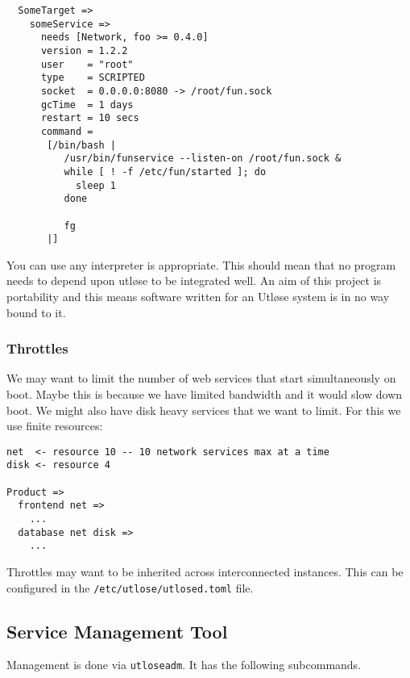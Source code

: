 \documentclass{article}
\begin{document}
\begin{verbatim}
  SomeTarget =>
    someService =>
      needs [Network, foo >= 0.4.0]
      version = 1.2.2
      user    = "root"
      type    = SCRIPTED
      socket  = 0.0.0.0:8080 -> /root/fun.sock
      gcTime  = 1 days
      restart = 10 secs
      command = 
       [/bin/bash |
          /usr/bin/funservice --listen-on /root/fun.sock &
          while [ ! -f /etc/fun/started ]; do
            sleep 1
          done

          fg
       |]
\end{verbatim}

You can use any interpreter is appropriate. This should mean that no program needs to depend
upon utløse to be integrated well. An aim of this project is portability and this means
software written for an Utløse system is in no way bound to it.

\subsubsection{Throttles}
We may want to limit the number of web services that start simultaneously on boot.
Maybe this is because we have limited bandwidth and it would slow down boot.
We might also have disk heavy services that we want to limit.
For this we use finite resources:

\begin{verbatim}
net  <- resource 10 -- 10 network services max at a time
disk <- resource 4

Product =>
  frontend net =>
    ...
  database net disk =>
    ...
\end{verbatim}
Throttles may want to be inherited across interconnected instances. This can be configured in
the \texttt{/etc/utlose/utlosed.toml} file.

\subsection{Service Management Tool}
Management is done via \texttt{utloseadm}. It has the following subcommands.
\end{document}
